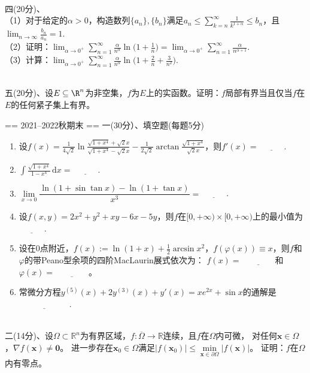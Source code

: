 ~\\
四(20分)、\\
（1）对于给定的$\alpha>0$，构造数列$\{a_n\},\{b_n\}$满足$\displaystyle a_n\le\sum_{k=n}^\infty\frac{1}{k^{1+\alpha}}\le b_n$，且$\displaystyle \lim_{n\to\infty}\frac{b_n}{a_n}=1$.\\
（2）证明：$\displaystyle \lim_{\alpha\to0^+}\sum_{n=1}^\infty\frac{\alpha}{n^\alpha}\ln\Big(1+\frac{1}{n}\Big)=\lim_{\alpha\to0^+}\sum_{n=1}^\infty\frac{\alpha}{n^{\alpha+1}}$.\\
（3）计算：$\displaystyle \lim_{\alpha\to0^+}\sum_{n=1}^\infty\frac{\alpha}{n^\alpha}\ln\Big(1+\frac{2}{n}+\frac{3}{n^2}\Big)$.

~\\
五(20分)、设$E\subseteq\R^n$为非空集，$f$为$E$上的实函数。证明：$f$局部有界当且仅当$f$在$E$的任何紧子集上有界。


== 2021--2022秋期末 ==
一(30分）、填空题(每题5分)
\begin{enumerate}[label=(\arabic*)]
\item 设$\displaystyle f(x)=\frac{1}{4\sqrt{2}}\ln\frac{\sqrt{1+x^4}+\sqrt{2}x}{\sqrt{1+x^4}-\sqrt{2}x}-\frac{1}{2\sqrt{2}}\arctan\frac{\sqrt{1+x^4}}{\sqrt{2}x}$，则$f'(x)=\underline{\qquad\quad}$.\\
\item $\displaystyle \int\frac{\sqrt{1+x^4}}{1-x^4} \,\mathrm{d}x=\underline{\qquad\quad}$.\\
\item $\lim\limits_{x \to 0}\dfrac{\ln(1+\sin\tan x)-\ln(1+\tan x)}{x^3}=\underline{\qquad\quad}$.\\
\item 设$f(x,y)=2x^2+y^2+xy-6x-5y$，则$f$在$[0,+\infty)\times[0,+\infty)$上的最小值为$\underline{\qquad\quad}$.\\
\item 设在$0$点附近，$f(x):=\ln(1+x)+\frac{1}{2}\arcsin x^2$，$f(\varphi(x)) \equiv x$，则$f$和$\varphi$的带Peano型余项的四阶MacLaurin展式依次为：
$f(x)=\underline{\qquad\qquad}$和$\varphi(x)=\underline{\qquad\qquad}$。
\item 常微分方程$y^{(5)}(x)+2y^{(3)}(x)+y'(x)=xe^{2x}+\sin x$的通解是$\underline{\qquad\qquad\qquad}$.\\
\end{enumerate}
~\\
二(14分)、设$\Omega \subset \mathbb{R}^n$为有界区域，$f:\overline{\Omega}\to \mathbb{R}$连续，且$f$在$\Omega$内可微，
对任何$\mathbf{x}\in \Omega$，$\nabla f(\mathbf{x})\ne \mathbf{0}$。
进一步存在$\mathbf{x}_0 \in \Omega$满足$|f(\mathbf{x}_0)|\le \min\limits_{\mathbf{x}\in \partial\Omega}|f(\mathbf{x})|$。
证明：$f$在$\Omega$内有零点。

